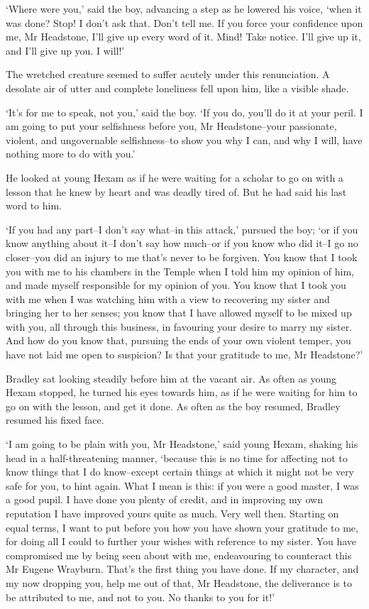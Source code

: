‘Where were you,’ said the boy, advancing a step as he lowered his
voice, ‘when it was done? Stop! I don’t ask that. Don’t tell me. If you
force your confidence upon me, Mr Headstone, I’ll give up every word of
it. Mind! Take notice. I’ll give up it, and I’ll give up you. I will!’

The wretched creature seemed to suffer acutely under this renunciation.
A desolate air of utter and complete loneliness fell upon him, like a
visible shade.

‘It’s for me to speak, not you,’ said the boy. ‘If you do, you’ll do
it at your peril. I am going to put your selfishness before you, Mr
Headstone--your passionate, violent, and ungovernable selfishness--to
show you why I can, and why I will, have nothing more to do with you.’

He looked at young Hexam as if he were waiting for a scholar to go on
with a lesson that he knew by heart and was deadly tired of. But he had
said his last word to him.

‘If you had any part--I don’t say what--in this attack,’ pursued the
boy; ‘or if you know anything about it--I don’t say how much--or if you
know who did it--I go no closer--you did an injury to me that’s never
to be forgiven. You know that I took you with me to his chambers in the
Temple when I told him my opinion of him, and made myself responsible
for my opinion of you. You know that I took you with me when I was
watching him with a view to recovering my sister and bringing her to her
senses; you know that I have allowed myself to be mixed up with you, all
through this business, in favouring your desire to marry my sister. And
how do you know that, pursuing the ends of your own violent temper, you
have not laid me open to suspicion? Is that your gratitude to me, Mr
Headstone?’

Bradley sat looking steadily before him at the vacant air. As often
as young Hexam stopped, he turned his eyes towards him, as if he were
waiting for him to go on with the lesson, and get it done. As often as
the boy resumed, Bradley resumed his fixed face.

‘I am going to be plain with you, Mr Headstone,’ said young Hexam,
shaking his head in a half-threatening manner, ‘because this is no time
for affecting not to know things that I do know--except certain things
at which it might not be very safe for you, to hint again. What I mean
is this: if you were a good master, I was a good pupil. I have done you
plenty of credit, and in improving my own reputation I have improved
yours quite as much. Very well then. Starting on equal terms, I want to
put before you how you have shown your gratitude to me, for doing all
I could to further your wishes with reference to my sister. You have
compromised me by being seen about with me, endeavouring to counteract
this Mr Eugene Wrayburn. That’s the first thing you have done. If my
character, and my now dropping you, help me out of that, Mr Headstone,
the deliverance is to be attributed to me, and not to you. No thanks to
you for it!’

